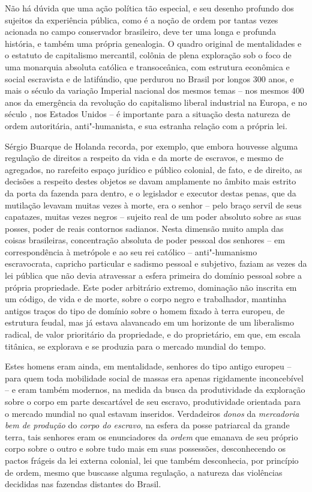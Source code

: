 Não há dúvida que uma ação política tão especial, e seu desenho profundo
dos sujeitos da experiência pública, como é a noção de ordem por tantas
vezes acionada no campo conservador brasileiro, deve ter uma longa e
profunda história, e também uma própria genealogia. O quadro original de
mentalidades e o estatuto de capitalismo mercantil, colônia de plena
exploração sob o foco de uma monarquia absoluta católica e
transoceânica, com estrutura econômica e social escravista e de
latifúndio, que perdurou no Brasil por longos 300 anos, e mais o século
da variação Imperial nacional dos mesmos temas -- nos mesmos 400 anos da
emergência da revolução do capitalismo liberal industrial na Europa, e
no século , nos Estados Unidos -- é importante para a situação desta
natureza de ordem autoritária, anti"-humanista, e sua estranha relação
com a própria lei.

Sérgio Buarque de Holanda recorda, por exemplo, que embora houvesse
alguma regulação de direitos a respeito da vida e da morte de escravos,
e mesmo de agregados, no rarefeito espaço jurídico e público colonial,
de fato, e de direito, as decisões a respeito destes objetos se davam
amplamente no âmbito mais estrito da porta da fazenda para dentro, e o
legislador e executor destas penas, que da mutilação levavam muitas
vezes à morte, era o senhor -- pelo braço servil de seus capatazes,
muitas vezes negros -- sujeito real de um poder absoluto sobre as suas
posses, poder de reais contornos sadianos. Nesta dimensão muito ampla
das coisas brasileiras, concentração absoluta de poder pessoal dos
senhores -- em correspondência à metrópole e ao seu rei católico --
anti"-humanismo escravocrata, capricho particular e sadismo pessoal e
subjetivo, faziam as vezes da lei pública que não devia atravessar a
esfera primeira do domínio pessoal sobre a própria propriedade. Este
poder arbitrário extremo, dominação não inscrita em um código, de vida e
de morte, sobre o corpo negro e trabalhador, mantinha antigos traços do
tipo de domínio sobre o homem fixado à terra europeu, de estrutura
feudal, mas já estava alavancado em um horizonte de um liberalismo
radical, de valor prioritário da propriedade, e do proprietário, em que,
em escala titânica, se explorava e se produzia para o mercado mundial do
tempo.

Estes homens eram ainda, em mentalidade, senhores do tipo antigo europeu
-- para quem toda mobilidade social de massas era apenas rigidamente
inconcebível -- e eram também modernos, na medida da busca da
produtividade da exploração sobre o corpo em parte descartável de seu
escravo, produtividade orientada para o mercado mundial no qual estavam
inseridos. Verdadeiros \emph{donos} da \emph{mercadoria bem de produção}
do \emph{corpo do escravo}, na esfera da posse patriarcal da grande
terra, tais senhores eram os enunciadores da \emph{ordem} que emanava de
seu próprio corpo sobre o outro e sobre tudo mais em suas possessões,
desconhecendo os pactos frágeis da lei externa colonial, lei que também
desconhecia, por princípio de ordem, mesmo que buscasse alguma
regulação, a natureza das violências decididas nas fazendas distantes do
Brasil.

